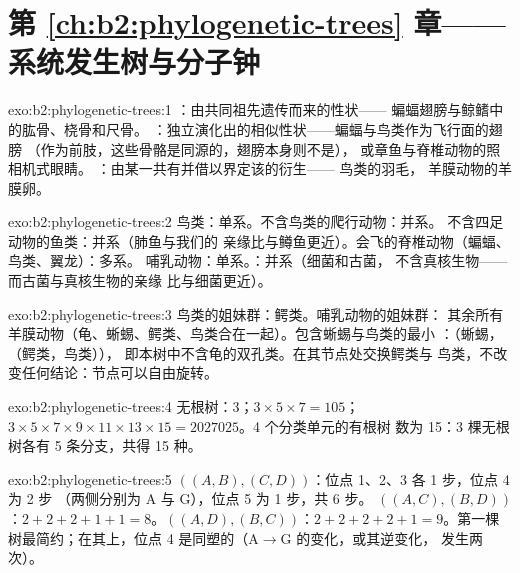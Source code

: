 \section*{第 \ref{ch:b2:phylogenetic-trees} 章——系统发生树与分子钟}

\begin{solution}{exo:b2:phylogenetic-trees:1}
：由共同祖先遗传而来的性状——
蝙蝠翅膀与鲸鳍中的肱骨、桡骨和尺骨。
：独立演化出的相似性状——蝙蝠与鸟类作为飞行面的翅膀
（作为前肢，这些骨骼是同源的，翅膀本身则不是），
或章鱼与脊椎动物的照相机式眼睛。
：由某一共有并借以界定该的衍生——
鸟类的羽毛，
羊膜动物的羊膜卵。
\end{solution}

\begin{solution}{exo:b2:phylogenetic-trees:2}
鸟类：单系。不含鸟类的爬行动物：并系。
不含四足动物的鱼类：并系（肺鱼与我们的
亲缘比与鳟鱼更近）。会飞的脊椎动物（蝙蝠、鸟类、翼龙）：多系。
哺乳动物：单系。：并系（细菌和古菌，
不含真核生物——而古菌与真核生物的亲缘
比与细菌更近）。
\end{solution}

\begin{solution}{exo:b2:phylogenetic-trees:3}
鸟类的姐妹群：鳄类。哺乳动物的姐妹群：
其余所有羊膜动物（龟、蜥蜴、鳄类、鸟类合在一起）。包含蜥蜴与鸟类的最小
：（蜥蜴，（鳄类，鸟类）），
即本树中不含龟的双孔类。在其节点处交换鳄类与
鸟类，不改变任何结论：节点可以自由旋转。
\end{solution}

\begin{solution}{exo:b2:phylogenetic-trees:4}
无根树：$3$；$3\times 5\times 7 = 105$；$3\times 5\times
7\times 9\times 11\times 13\times 15 = \num{2027025}$。4 个分类单元的有根树
数为 15：3 棵无根树各有 5 条分支，共得 15 种。
\end{solution}

\begin{solution}{exo:b2:phylogenetic-trees:5}
$((A,B),(C,D))$：位点 1、2、3 各 1 步，位点 4 为 2 步
（两侧分别为 $\mathrm{A}$ 与 $\mathrm{G}$），位点 5 为 1 步，共 6 步。
$((A,C),(B,D))$：$2 + 2 + 2 + 1 + 1 = 8$。$((A,D),(B,C))$：$2 + 2 + 2 +
2 + 1 = 9$。第一棵树最简约；在其上，位点 4 是同塑的（$\mathrm{A}\to\mathrm{G}$
的变化，或其逆变化，
发生两次）。
\end{solution}

